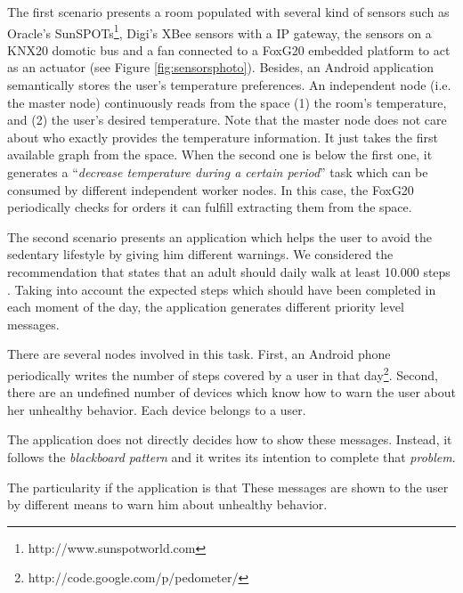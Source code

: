 \bigskip

The first scenario presents a room populated with several kind of sensors such as Oracle's SunSPOTs\footnote{http://www.sunspotworld.com},
Digi's XBee sensors with a IP gateway,
the sensors on a KNX20 domotic bus and a fan connected to a FoxG20 embedded platform to act as an actuator (see Figure \ref{fig:sensorsphoto}).
Besides, an Android application semantically stores the user's temperature preferences.
An independent node (i.e. the master node) continuously reads from the space %
(1) the room's temperature, and
(2) the user's desired temperature.
Note that the master node does not care about who exactly provides the temperature information.
It just takes the first available graph from the space.
When the second one is below the first one, it generates a ``\emph{decrease temperature during a certain period}'' task which can be consumed by different independent worker nodes.
In this case, the FoxG20 periodically checks for orders it can fulfill extracting them from the space. %

\medskip


The second scenario presents an application which helps the user to avoid the sedentary lifestyle by giving him different warnings.
We considered the recommendation that states that an adult should daily walk at least 10.000 steps \citep{tudor2002taking}.
Taking into account the expected steps which should have been completed in each moment of the day, the application generates different priority level messages.

There are several nodes involved in this task.
First, an Android phone periodically writes the number of steps covered by a user in that day\footnote{http://code.google.com/p/pedometer/}.
Second, there are an undefined number of devices which know how to warn the user about her unhealthy behavior.
Each device belongs to a user.


The application does not directly decides how to show these messages.
Instead, it follows the \emph{blackboard pattern} and it writes its intention to complete that \emph{problem}.

The particularity if the application is that 
These messages are shown to the user by different means to warn him about unhealthy behavior.

